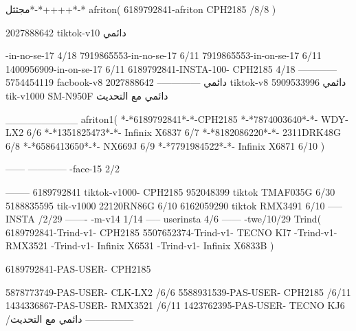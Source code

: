 مجثثل*-*++++*-*
afriton(
6189792841-afriton CPH2185  /8/8
)

2027888642 tiktok-v10
دائمي

-in-no-se-17 4/18
7919865553-in-no-se-17 6/11
7919865553-in-on-se-17 6/11
1400956909-in-on-se-17 6/11
6189792841-INSTA-100- CPH2185 4/18
------------
5754454119 facbook-v8
دائمي
--------------
2027888642 tiktok-v8
دائمي
5909533996 tik-v1000  SM-N950F
دائمي مع التحديث

__________
afriton1(
*-*6189792841*-*-CPH2185
*-*7874003640*-*- WDY-LX2  6/6
*-*1351825473*-*- Infinix X6837  6/7
*-*8182086220*-*- 2311DRK48G  6/8
*-*6586413650*-*- NX669J  6/9
*-*7791984522*-*- Infinix X6871  6/10
)


------
------------
-face-15 2/2

--------
6189792841 tiktok-v1000- CPH2185 
952048399 tiktok TMAF035G  6/30
5188835595 tik-v1000 22120RN86G  6/10
6162059290 tiktok RMX3491  6/10
-----
 INSTA /2/29
-------
-m-v14 1/14
-----
userinsta 4/6
------
-twe/10/29
Trind(
6189792841-Trind-v1- CPH2185 
5507652374-Trind-v1- TECNO KI7 \6-Trind-v1- RMX3521 \6-Trind-v1-  Infinix X6531 \6-Trind-v1-   Infinix X6833B \6
)


6189792841-PAS-USER- CPH2185 

5878773749-PAS-USER- CLK-LX2  /6/6
5588931539-PAS-USER- CPH2185  /6/11
1434336867-PAS-USER- RMX3521  /6/11
1423762395-PAS-USER- TECNO KJ6  /دائمي مع التحديث
    ---------------
